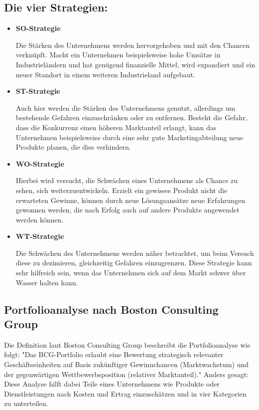     \subsection*{Die vier Strategien:}
    \begin{itemize}
      \item \textbf{SO-Strategie}

      Die Stärken des Unternehmens werden hervorgehoben und mit den Chancen verknüpft. Macht ein Unternehmen beispielsweise hohe Umsätze in Industrieländern und hat
      genügend finanzielle Mittel, wird expandiert und ein neuer Standort in einem weiteren Industrieland aufgebaut.

      \item \textbf{ST-Strategie}

      Auch hier werden die Stärken des Unternehmens genutzt, allerdings um bestehende Gefahren einzuschränken oder zu entfernen. Besteht die Gefahr, dass die Konkurrenz
      einen höheren Marktanteil erlangt, kann das Unternehmen beispielsweise durch eine sehr gute Marketingabteilung neue Produkte planen, die dies verhindern.

      \item \textbf{WO-Strategie}

      Hierbei wird versucht, die Schwächen eines Unternehmens als Chance zu sehen, sich weiterzuentwickeln. Erzielt ein gewisses Produkt nicht die erwarteten Gewinne,
      können durch neue Lösungsansätze neue Erfahrungen gewonnen werden, die nach Erfolg auch auf andere Produkte angewendet werden können.

      \newpage

      \item \textbf{WT-Strategie}

      Die Schwächen des Unternehmens werden näher betrachtet, um beim Versuch diese zu dezimieren, gleichzeitig Gefahren einzugrenzen. Diese Strategie kann sehr hilfreich
      sein, wenn das Unternehmen sich auf dem Markt schwer über Wasser halten kann.
    \end{itemize}

    \subsection*{Portfolioanalyse nach Boston Consulting Group}
    Die Definition laut {Boston Consulting Group\cite{portfolioanalyse}} beschreibt die Portfolioanalyse wie folgt:
    "Das BCG-Portfolio erlaubt eine Bewertung strategisch relevanter Geschäftseinheiten auf Basis zukünftiger Gewinnchancen (Marktwachstum) und der
    gegenwärtigen Wettbewerbsposition (relativer Marktanteil)."
    Anders gesagt: Diese Analyse hilft dabei Teile eines Unternehmens wie Produkte oder Dienstleistungen
    nach Kosten und Ertrag einzuschätzen und in vier Kategorien zu unterteilen.

